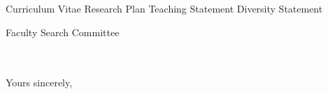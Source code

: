 



\addAttach%
{Curriculum Vitae}%
{Research Plan}%
{Teaching Statement}%
{Diversity Statement}

\def\appJobID{%
    \ifthenelse{\equal{\jobID}{}}{\unskip}{\unskip\textemdash Job \# \jobID{}}%
}
\def\toAddr{%
Faculty Search Committee \\ \appDept{} \\ \appSchool{} \\ \appAddr{}%
}

\begin{letter}{\toAddr{}}
    \opening{\myOpening{}}
    
    \collabCustom{}%
    
    \closing{Yours sincerely,}
    \encl{\listAttach{}}
\end{letter}
